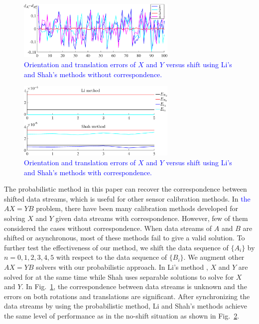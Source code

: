 \documentclass[letterpaper, 10 pt, conference]{ieeeconf}  %
\begin{document}
\begin{figure}[t!]
\centering
\includegraphics[width=3in]{fig5.eps}
\caption{
\textcolor{blue}{Orientation and translation errors of $X$ and $Y$ versus shift using Li's and Shah's methods without correspondence.}
}
\label{fig5}
\end{figure}

\begin{figure}[t!]
\centering
\includegraphics[width=3in]{fig6.eps}
\caption{
\textcolor{blue}{Orientation and translation errors of $X$ and $Y$ versus shift using Li's and Shah's methods with correspondence.}
}
\label{fig6}
\end{figure}

The probabilistic method in this paper can recover the correspondence between shifted data streams, which is useful for other sensor calibration methods. In \textcolor{blue}{the} $AX=YB$ problem, there have been many calibration methods developed for solving $X$ and $Y$ given data streams with correspondence. However, few of them considered the cases without correspondence. When data streams of ${A}$ and ${B}$ are shifted or asynchronous, most of these methods fail to give a valid solution. To further test the effectiveness of our method, we shift the data sequence of $\{A_i\}$ by $n=0,1,2,3,4,5$ with respect to the data sequence of $\{B_i\}$. We augment other $AX=YB$ solvers with our probabilistic approach. In Li's method \cite{Li2010}, $X$ and $Y$ are solved for at the same time while Shah \cite{Shah2013} uses separable solutions to solve for $X$ and $Y$. In Fig.~\ref{fig5}, the correspondence between data streams is unknown and the errors on both rotations and translations are significant. After synchronizing the data streams by using the probabilistic method, Li and Shah's methods achieve the same level of performance as in the no-shift situation as shown in Fig.~\ref{fig6}.
\end{document}
